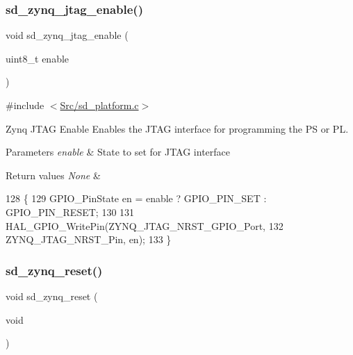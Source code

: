 \subsubsection{\texorpdfstring{sd\+\_\+zynq\+\_\+jtag\+\_\+enable()}{sd\_zynq\_jtag\_enable()}}
{\footnotesize\ttfamily void sd\+\_\+zynq\+\_\+jtag\+\_\+enable (\begin{DoxyParamCaption}\item[{uint8\+\_\+t}]{enable }\end{DoxyParamCaption})}



{\ttfamily \#include $<$\mbox{\hyperlink{sd__platform_8c}{Src/sd\+\_\+platform.\+c}}$>$}



Zynq J\+T\+AG Enable Enables the J\+T\+AG interface for programming the PS or PL. 


\begin{DoxyParams}{Parameters}
{\em enable} & State to set for J\+T\+AG interface \\
\hline
\end{DoxyParams}

\begin{DoxyRetVals}{Return values}
{\em None} & \\
\hline
\end{DoxyRetVals}

\begin{DoxyCode}
128 \{
129     GPIO\_PinState en = enable ? GPIO\_PIN\_SET : GPIO\_PIN\_RESET;
130 
131     HAL\_GPIO\_WritePin(ZYNQ\_JTAG\_NRST\_GPIO\_Port, 
132               ZYNQ\_JTAG\_NRST\_Pin, en);
133 \}
\end{DoxyCode}
\mbox{\label{group___s_d___platform___boot___config_ga65b13e7293170788758e4f8cd8512326}} 
\subsubsection{\texorpdfstring{sd\+\_\+zynq\+\_\+reset()}{sd\_zynq\_reset()}}
{\footnotesize\ttfamily void sd\+\_\+zynq\+\_\+reset (\begin{DoxyParamCaption}\item[{void}]{ }\end{DoxyParamCaption})}



